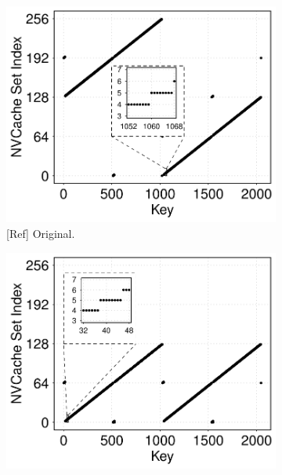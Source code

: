 
\begin{figure}[t]
    \centering
    \begin{subfigure}[b]{.24\linewidth}
        \centering
        \includegraphics[width=\linewidth]{figure/plot/reference/fig16-pmdk-kv-memory-layout.tikz.pdf}
        \caption{[Ref] Original.}
        \label{fig:16:ref:pmdk-kv-memory-layout-original}
    \end{subfigure}
    \begin{subfigure}[b]{.24\linewidth}
        \centering
        \includegraphics[width=\linewidth]{figure/plot/reference/fig16-pmdk-kv-memory-layout-secure.tikz.pdf}

\end{subfigure}
\end{figure}
